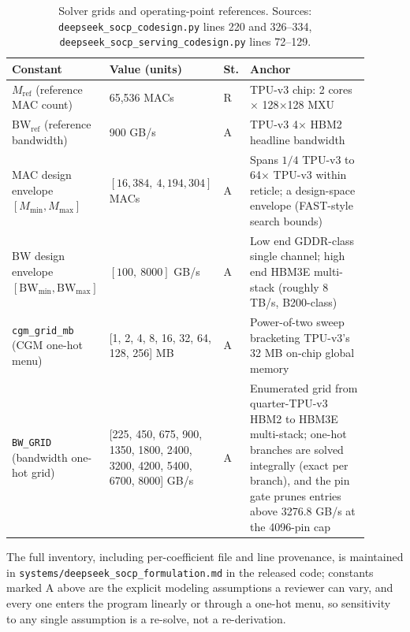 \begin{table}[h]
\centering
\footnotesize
\begin{tabular}{@{}p{0.26\linewidth}p{0.17\linewidth}p{0.045\linewidth}p{0.42\linewidth}@{}}
\toprule
Constant & Value (units) & St. & Anchor \\
\midrule
$M_{\mathrm{ref}}$ (reference MAC count) & 65{,}536 MACs & R & TPU-v3 chip: 2 cores $\times$ 128$\times$128 MXU \citep{jouppi2021ten} \\
$\mathrm{BW}_{\mathrm{ref}}$ (reference bandwidth) & 900 GB/s & A & TPU-v3 4$\times$ HBM2 headline bandwidth \citep{jouppi2021ten} \\
MAC design envelope $[M_{\min}, M_{\max}]$ & $[16{,}384,\ 4{,}194{,}304]$ MACs & A & Spans $1/4$ TPU-v3 to 64$\times$ TPU-v3 within reticle; a design-space envelope (FAST-style search bounds) \citep{zhang_fast} \\
BW design envelope $[\mathrm{BW}_{\min}, \mathrm{BW}_{\max}]$ & $[100,\ 8000]$ GB/s & A & Low end GDDR-class single channel; high end HBM3E multi-stack (roughly 8 TB/s, B200-class) \\
\texttt{cgm\_grid\_mb} (CGM one-hot menu) & [1, 2, 4, 8, 16, 32, 64, 128, 256] MB & A & Power-of-two sweep bracketing TPU-v3's 32 MB on-chip global memory \citep{jouppi2021ten} \\
\texttt{BW\_GRID} (bandwidth one-hot grid) & [225, 450, 675, 900, 1350, 1800, 2400, 3200, 4200, 5400, 6700, 8000] GB/s & A & Enumerated grid from quarter-TPU-v3 HBM2 to HBM3E multi-stack; one-hot branches are solved integrally (exact per branch), and the pin gate prunes entries above 3276.8 GB/s at the 4096-pin cap \\
\bottomrule
\end{tabular}
\caption{Solver grids and operating-point references. Sources: \texttt{deepseek\_socp\_codesign.py} lines 220 and 326--334, \texttt{deepseek\_socp\_serving\_codesign.py} lines 72--129.}
\label{tab:coeff_grids}
\end{table}

The full inventory, including per-coefficient file and line provenance, is
maintained in \texttt{systems/deepseek\_socp\_formulation.md} in the released
code; constants marked A above are the explicit modeling assumptions a
reviewer can vary, and every one enters the program linearly or through a
one-hot menu, so sensitivity to any single assumption is a re-solve, not a
re-derivation.
